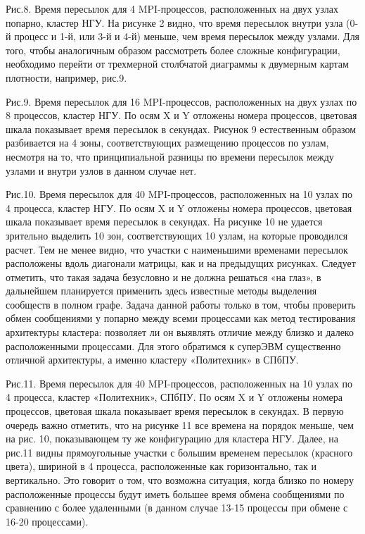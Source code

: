         Рис.8. Время пересылок для 4 MPI-процессов, расположенных на двух узлах попарно, кластер НГУ.
        На рисунке 2 видно, что время пересылок внутри узла (0-й процесс и 1-й, или 3-й и 4-й) меньше, чем время пересылок между узлами. Для того, чтобы аналогичным образом рассмотреть более сложные конфигурации, необходимо перейти от трехмерной столбчатой диаграммы к двумерным картам плотности, например, рис.9. 
        
        Рис.9. Время пересылок для 16 MPI-процессов, расположенных на двух узлах по 8 процессов, кластер НГУ. По осям X и Y отложены номера процессов, цветовая шкала показывает время пересылок в секундах.
        Рисунок 9 естественным образом разбивается на 4 зоны, соответствующих размещению процессов по узлам, несмотря на то, что принципиальной разницы по времени пересылок между узлами и внутри узлов в данном случае нет.
        
        Рис.10. Время пересылок для 40 MPI-процессов, расположенных на 10 узлах по 4 процесса, кластер НГУ. По осям X и Y отложены номера процессов, цветовая шкала показывает время пересылок в секундах.
        На рисунке 10 не удается зрительно выделить 10 зон, соответствующих 10 узлам, на которые проводился расчет. Тем не менее видно, что участки с наименьшими временами пересылок расположены вдоль диагонали матрицы, как и на предыдущих рисунках.
        Следует отметить, что такая задача безусловно и не должна решаться «на глаз», в дальнейшем планируется применить здесь известные методы выделения сообществ в полном графе. Задача данной работы только в том, чтобы проверить обмен сообщениями у попарно между всеми процессами как метод тестирования архитектуры кластера: позволяет ли он выявлять отличие между близко и далеко расположенными процессами. Для этого обратимся к суперЭВМ существенно отличной архитектуры, а именно кластеру «Политехник» в СПбПУ.
        
        Рис.11. Время пересылок для 40 MPI-процессов, расположенных на 10 узлах по 4 процесса, кластер «Политехник», СПбПУ. По осям X и Y отложены номера процессов, цветовая шкала показывает время пересылок в секундах.
        В первую очередь важно отметить, что на рисунке 11 все времена на порядок меньше, чем на рис. 10, показывающем ту же конфигурацию для кластера НГУ. Далее, на рис.11 видны прямоугольные участки с большим временем пересылок (красного цвета), шириной в 4 процесса, расположенные как горизонтально, так и вертикально. Это говорит о том, что возможна ситуация, когда близко по номеру расположенные процессы будут иметь большее время обмена сообщениями по сравнению с более удаленными (в данном случае 13-15 процессы при обмене с  16-20 процессами). 
        
